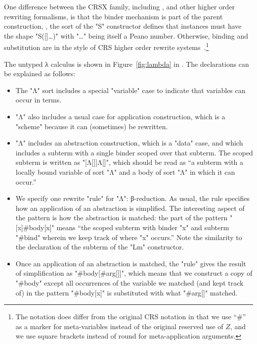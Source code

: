 \documentclass[letterpaper,11pt]{article}
\begin{document}
\begin{remark}
  One difference between the CRSX family, including \hax, and other higher order rewriting
  formalisms, is that the binder mechanism is part of the parent construction, \eg, the sort of the
  "S" constructor defines that instances must have the shape "S([]…)" with "…" being itself a Peano
  number.  Otherwise, binding and substitution are in the style of CRS higher order rewrite
  systems~\cite{Klop+:tcs1993}.\footnote{The notation does differ from the original CRS notation in
    that we use ``\#'' as a marker for meta-variables instead of the original reserved use of $Z$,
    and we use square brackets instead of round for meta-application arguments.}
\end{remark}

\begin{example}\label{ex:lambda}
  The untyped λ calculus is shown in Figure~\ref{fig:lambda} in \hax.  The declarations can be
  explained as follows:
  \begin{itemize}

  \item The "Λ" sort includes a special "variable" case to indicate that variables can occur in
    terms.

  \item "Λ" also includes a usual case for application construction, which is a "scheme" because it
    can (sometimes) be rewritten.

  \item "Λ" includes an abstraction construction, which is a "data" case, and which includes a
    subterm with a single binder scoped over that subterm. The scoped subterm is written as
    "[Λ[]]Λ[]", which should be read as ``a subterm with a locally bound variable of sort "Λ" and a
    body of sort "Λ" in which it can occur.''

  \item We specify one rewrite "rule" for "Λ": β-reduction. As usual, the rule specifies how an
    application of an abstraction is simplified. The interesting aspect of the pattern is how the
    abstraction is matched: the part of the pattern "[x]#body[x]" means ``the scoped subterm with
    binder "x" and subterm "#bind" wherein we keep track of where "x" occurs.'' Note the similarity
    to the declaration of the subterm of the "Lm" constructor.

  \item Once an application of an abstraction is matched, the "rule" gives the result of
    simplification as "#body[#arg[]]", which means that we construct a copy of "#body" except all
    occurrences of the variable we matched (and kept track of) in the pattern "#body[x]" is
    substituted with what "#arg[]" matched.


\end{itemize}
\end{example}
\end{document}
